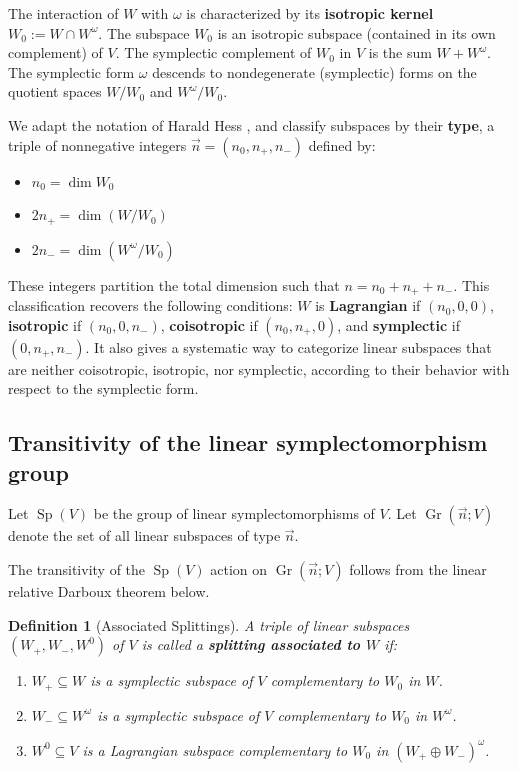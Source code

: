 \documentclass[12pt, final]{article}
\def\Sp{\operatorname{Sp}}
\def\Gr{\operatorname{Gr}}
\newtheorem{definition}[theorem]{Definition}
\begin{document}
The interaction of $W$ with $\omega$ is characterized by its \textbf{isotropic kernel} $W_0 := W \cap W^\omega$. The subspace $W_0$ is an isotropic subspace (contained in its own complement) of $V$. The symplectic complement of $W_0$ in $V$ is the sum $W + W^\omega$. The symplectic form $\omega$ descends to nondegenerate (symplectic) forms on the quotient spaces $W/W_0$ and $W^\omega/W_0$.

We adapt the notation of Harald Hess \cite[Definition 3.1]{Hess}, and classify subspaces by their \textbf{type}, a triple of nonnegative integers $\vec{n} = (n_0, n_+, n_-)$ defined by:
\begin{itemize}
    \item $n_0 = \dim W_0$
    \item $2n_+ = \dim (W/W_0)$
    \item $2n_- = \dim (W^\omega/W_0)$
\end{itemize}
These integers partition the total dimension such that $n = n_0 + n_+ + n_-$. This classification recovers the following conditions: $W$ is \textbf{Lagrangian} if $(n_0, 0, 0)$, \textbf{isotropic} if $(n_0, 0, n_-)$, \textbf{coisotropic} if $(n_0, n_+, 0)$, and \textbf{symplectic} if $(0, n_+, n_-)$. It also gives a systematic way to categorize linear subspaces that are neither coisotropic, isotropic, nor symplectic, according to their behavior with respect to the symplectic form.

\subsection{Transitivity of the linear symplectomorphism group}
Let $\Sp(V)$ be the group of linear symplectomorphisms of $V$. Let $\Gr(\vec{n}; V)$ denote the set of all linear subspaces of type $\vec{n}$.

The transitivity of the $\Sp(V)$ action on $\Gr(\vec{n}; V)$ follows from the linear relative Darboux theorem below.

\begin{definition}[Associated Splittings]\label{def:splittings}
A triple of linear subspaces $(W_+, W_-, W^0)$ of $V$ is called a \textbf{splitting associated to $W$} if:
\begin{enumerate}
    \item $W_+ \subseteq W$ is a symplectic subspace of $V$ complementary to $W_0$ in $W$.
    \item $W_- \subseteq W^\omega$ is a symplectic subspace of $V$ complementary to $W_0$ in $W^\omega$.
    \item $W^0 \subseteq V$ is a Lagrangian subspace complementary to $W_0$ in $(W_+ \oplus W_-)^\omega$.
\end{enumerate}
\end{definition}
\end{document}

